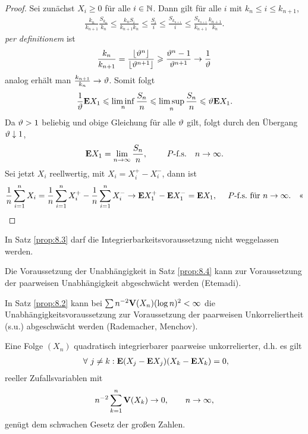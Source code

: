\begin{proof}
Sei zunächst $X_i\ge 0$ für alle $i\in\mathbb{N}$. Dann gilt für alle $i$ mit $k_n\le
i\le k_{n+1}$,
\begin{align*}
\frac{k_n}{k_{n+1}}\frac{S_{k_n}}{k_n}
\le \frac{k_n S_i}{k_{n+1}k_n}
\le \frac{S_i}{i}
\le \frac{S_{k_{n+1}}}{i}
\le \frac{S_{k_{n+1}}}{k_{n+1}}\frac{k_{n+1}}{k_n}.
\end{align*}
\textit{per definitionem} ist 
\begin{align*}
\frac{k_n}{k_{n+1}} = \frac{\lfloor \vartheta^n\rfloor}{\lfloor \vartheta^{n+1}\rfloor}
\geqslant \frac{\vartheta^n-1}{\vartheta^{n+1}} \to \frac{1}{\vartheta} 
\end{align*}
analog erhält man $\frac{k_{n+1}}{k_n}\to \vartheta$. Somit folgt
\begin{align*}
\frac{1}{\vartheta}\textbf{E} X_1 \leqslant \liminf_n \frac{S_n}{n}
\leqslant \limsup_n \frac{S_n}{n} \leqslant \vartheta \textbf{E} X_1.
\end{align*}
Da $\vartheta>1$ beliebig und obige Gleichung für alle $\vartheta$ gilt, folgt durch den
Übergang $\vartheta\downarrow 1$,
\begin{align*}
\textbf{E} X_1 = \lim\limits_{n\to\infty} \frac{S_n}{n},\qquad \ P\text{-f.s.}\quad n\to \infty.
\end{align*}
Sei jetzt $X_i$ reellwertig, mit $X_i = X_i^+-X_i^-$, dann ist
\begin{align*}
\frac{1}{n}\sum\limits_{i=1}^n X_i 
= \frac{1}{n}\sum\limits_{i=1}^n X_i^+ -
\frac{1}{n}\sum\limits_{i=1}^n X_i^-
\to \textbf{E} X_1^+ - \textbf{E} X_1^- = \textbf{E} X_1,\quad \ P\text{-f.s.} \text{ für }n\to\infty.\quad\text{<<}
\end{align*}
\end{proof}


\begin{bem}[Bemerkungen.]
\label{bem:8.3}
\begin{bemenum}
\item In Satz \ref{prop:8.3} darf die Integrierbarkeitsvoraussetzung nicht
weggelassen werden.
\item Die Voraussetzung der Unabhängigkeit in Satz \ref{prop:8.4} kann zur
Voraussetzung der paarweisen Unabhängigkeit abgeschwächt werden (Etemadi).
\item In Satz \ref{prop:8.2} kann bei $\sum n^{-2}\textbf{V} (X_n)(\log n)^2< \infty$
die Unabhängigkeitsvoraussetzung zur Voraussetzung der paarweisen
Unkorreliertheit (s.u.) abgeschwächt werden (Rademacher, Menchov).\maphere
\end{bemenum}
\end{bem}

\begin{prop}
\label{prop:8.4}
Eine Folge $(X_n)$ quadratisch integrierbarer paarweise unkorrelierter, d.h. es gilt
\begin{align*}
\forall j\neq k : \E(X_j-\E X_j)(X_k-\E X_k) = 0,
\end{align*}
reeller Zufallsvariablen mit
\begin{align*}
n^{-2}\sum\limits_{k=1}^n \textbf{V}(X_k)\to 0,\qquad n\to\infty,
\end{align*}
genügt dem schwachen Gesetz der großen Zahlen.\fishhere
\end{prop}

